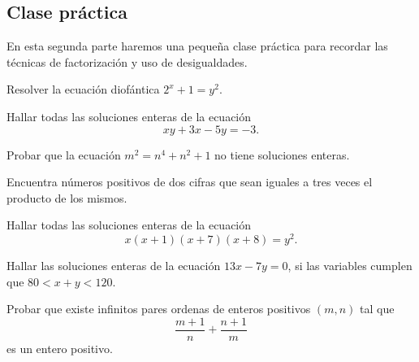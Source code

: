 \subsection{Clase práctica}

En esta segunda parte haremos una pequeña clase práctica para recordar las técnicas de factorización y uso de desigualdades.

\begin{exercise}
    Resolver la ecuación diofántica $2^x + 1 = y^2$.
\end{exercise}

\begin{exercise}
    Hallar todas las soluciones enteras de la ecuación
    \[
        xy + 3x - 5y = -3.
    \]
\end{exercise}

\begin{exercise}
    Probar que la ecuación $m^2 = n^4 + n^2 + 1$ no tiene soluciones enteras.
\end{exercise}

\begin{exercise}
    Encuentra números positivos de dos cifras que sean iguales a tres veces el producto de los mismos.
\end{exercise}

\begin{exercise}
    Hallar todas las soluciones enteras de la ecuación
    \[
        x(x + 1)(x + 7)(x + 8) = y^2.
    \]
\end{exercise}

\begin{exercise}
    Hallar las soluciones enteras de la ecuación $13x - 7y = 0$, si las variables cumplen que $80 < x + y < 120$.
\end{exercise}

\begin{exercise}
    Probar que existe infinitos pares ordenas de enteros positivos $(m,n)$ tal que
    \[
        \frac{m + 1}{n} + \frac{n + 1}{m}
    \]
    es un entero positivo.
\end{exercise}